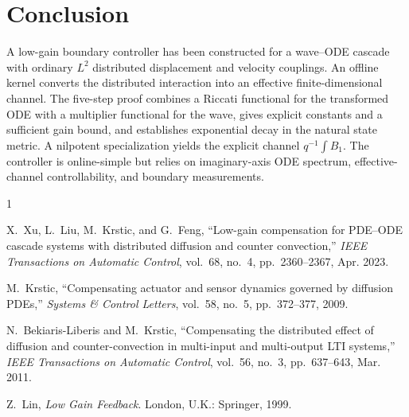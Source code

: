 \documentclass[journal]{IEEEtran}
\begin{document}
\section{Conclusion}

A low-gain boundary controller has been constructed for a wave--ODE cascade with ordinary \(L^2\) distributed displacement and velocity couplings. An offline kernel converts the distributed interaction into an effective finite-dimensional channel. The five-step proof combines a Riccati functional for the transformed ODE with a multiplier functional for the wave, gives explicit constants and a sufficient gain bound, and establishes exponential decay in the natural state metric. A nilpotent specialization yields the explicit channel \(q^{-1}\int B_1\). The controller is online-simple but relies on imaginary-axis ODE spectrum, effective-channel controllability, and boundary measurements.

\begin{thebibliography}{1}

X.~Xu, L.~Liu, M.~Krstic, and G.~Feng, ``Low-gain compensation for PDE--ODE cascade systems with distributed diffusion and counter convection,'' \emph{IEEE Transactions on Automatic Control}, vol.~68, no.~4, pp.~2360--2367, Apr. 2023.

M.~Krstic, ``Compensating actuator and sensor dynamics governed by diffusion PDEs,'' \emph{Systems \& Control Letters}, vol.~58, no.~5, pp.~372--377, 2009.

N.~Bekiaris-Liberis and M.~Krstic, ``Compensating the distributed effect of diffusion and counter-convection in multi-input and multi-output LTI systems,'' \emph{IEEE Transactions on Automatic Control}, vol.~56, no.~3, pp.~637--643, Mar. 2011.

Z.~Lin, \emph{Low Gain Feedback}. London, U.K.: Springer, 1999.

\end{thebibliography}
\end{document}
